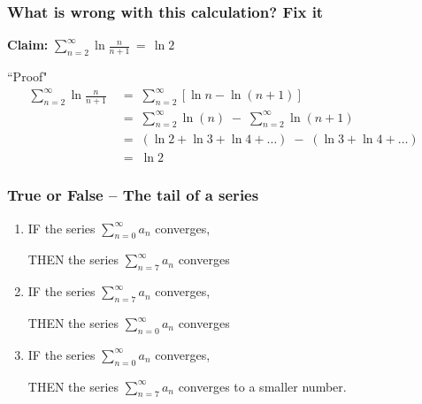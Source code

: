 \documentclass[14pt]{beamer}
\newcommand{\azul}[1]{{\color{blue} #1}}
\newcommand{\rojo}[1]{{\color{red} #1}}
\newcommand{\setsize}[1]{\fontsize{#1}{#1}\selectfont} %
\newcommand{\smallerfont}{\setsize{13}} %
\newcommand{\vvv}{\vspace{.2cm}}
\begin{document}
	\begin{frame}[t]
		\smallerfont
		\frametitle{What is wrong with this calculation? Fix it}

		{\bf Claim:} \;
		${\displaystyle \sum_{n=2}^{\infty} \ln \frac{n}{n+1} \, =\, \ln 2}$

		\begin{block}{``Proof"}
			\vspace{-.4cm}
			\begin{align*}
				\sum_{n=2}^{\infty}\ln \frac{n}{n+1}\; & = \; \sum_{n=2}^{\infty}\left[ \ln{n}- \ln(n+1) \right]                                             \\
				\;                                     & = \; \sum_{n=2}^{\infty}\ln (n) \; - \; \sum_{n=2}^{\infty}\ln (n+1)                                \\
				\;                                     & = \; \left( \ln 2 + \ln 3 + \ln 4 + \ldots \right) \; - \; ( \ln 3 + \ln 4 + \ldots) \phantom{\int} \\
				\;                                     & = \; \ln 2
			\end{align*}
		\end{block}
	\end{frame}

	\begin{frame}[t]
		\setsize{12}
		\frametitle{True or False -- The tail of a series}

		\begin{enumerate}
			\item IF the series \azul{${\displaystyle \sum_{n=0}^{\infty} a_n}$}
				converges,

				THEN the series \rojo{${\displaystyle \sum_{n=7}^{\infty} a_{n}}$} converges
				\vvv

			\item IF the series \rojo{${\displaystyle \sum_{n=7}^{\infty} a_n}$}
				converges,

				THEN the series \azul{${\displaystyle \sum_{n=0}^{\infty} a_{n}}$} converges
				\vvv

			\item IF the series \rojo{${\displaystyle \sum_{n=0}^{\infty} a_n}$}
				converges,

				THEN the series \azul{${\displaystyle \sum_{n=7}^{\infty} a_{n}}$} converges
				to a smaller number.
		\end{enumerate}
	\end{frame}
\end{document}
